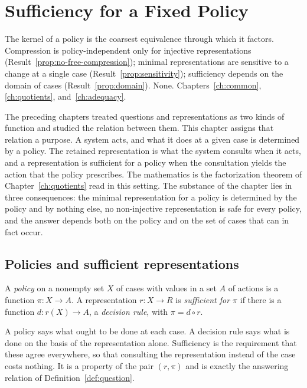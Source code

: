 \chapter{Sufficiency for a Fixed Policy}\label{ch:fixed}
{The kernel of a policy is the coarsest equivalence through which it factors.}
{Compression is policy-independent only for injective representations (Result~\ref{prop:no-free-compression}); minimal representations are sensitive to a change at a single case (Result~\ref{prop:sensitivity}); sufficiency depends on the domain of cases (Result~\ref{prop:domain}).}
{None.}
{Chapters~\ref{ch:common}, \ref{ch:quotients}, and~\ref{ch:adequacy}.}

The preceding chapters treated questions and representations as two kinds of function and studied the relation between them. This chapter assigns that relation a purpose. A system acts, and what it does at a given case is determined by a policy. The retained representation is what the system consults when it acts, and a representation is sufficient for a policy when the consultation yields the action that the policy prescribes. The mathematics is the factorization theorem of Chapter~\ref{ch:quotients} read in this setting. The substance of the chapter lies in three consequences: the minimal representation for a policy is determined by the policy and by nothing else, no non-injective representation is safe for every policy, and the answer depends both on the policy and on the set of cases that can in fact occur.

\section{Policies and sufficient representations}

\begin{definition}\label{def:policy}
A \emph{policy} on a nonempty set $X$ of cases with values in a set $A$ of actions is a function $\pi:X\to A$. A representation $r:X\to R$ is \emph{sufficient for $\pi$} if there is a function $d:r(X)\to A$, a \emph{decision rule}, with $\pi=d\circ r$.
\end{definition}

A policy says what ought to be done at each case. A decision rule says what is done on the basis of the representation alone. Sufficiency is the requirement that these agree everywhere, so that consulting the representation instead of the case costs nothing. It is a property of the pair $(r,\pi)$ and is exactly the answering relation of Definition~\ref{def:question}.

